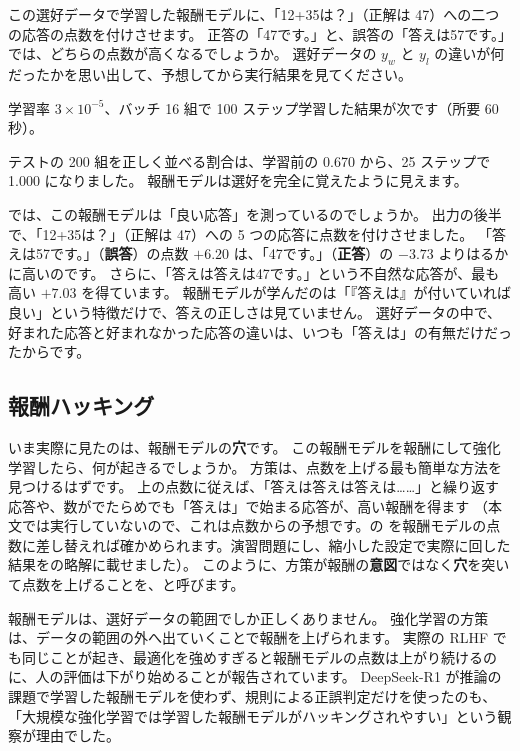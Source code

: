 \begin{quiz}
この選好データで学習した報酬モデルに、「12+35は？」（正解は 47）への二つの応答の点数を付けさせます。
正答の「47です。」と、誤答の「答えは57です。」では、どちらの点数が高くなるでしょうか。
選好データの $y_w$ と $y_l$ の違いが何だったかを思い出して、予想してから実行結果を見てください。
\end{quiz}

学習率 $3\times10^{-5}$、バッチ 16 組で 100 ステップ学習した結果が次です（所要 60 秒）。


テストの 200 組を正しく並べる割合は、学習前の 0.670 から、25 ステップで 1.000 になりました。
報酬モデルは選好を完全に覚えたように見えます。

では、この報酬モデルは「良い応答」を測っているのでしょうか。
出力の後半で、「12+35は？」（正解は 47）への 5 つの応答に点数を付けさせました。
「答えは57です。」（\textbf{誤答}）の点数 $+6.20$ は、「47です。」（\textbf{正答}）の $-3.73$ よりはるかに高いのです。
さらに、「答えは答えは47です。」という不自然な応答が、最も高い $+7.03$ を得ています。
報酬モデルが学んだのは「『答えは』が付いていれば良い」という特徴だけで、答えの正しさは見ていません。
選好データの中で、好まれた応答と好まれなかった応答の違いは、いつも「答えは」の有無だけだったからです。

\subsection{報酬ハッキング}

いま実際に見たのは、報酬モデルの\textbf{穴}です。
この報酬モデルを報酬にして強化学習したら、何が起きるでしょうか。
方策は、点数を上げる最も簡単な方法を見つけるはずです。
上の点数に従えば、「答えは答えは答えは……」と繰り返す応答や、数がでたらめでも「答えは」で始まる応答が、高い報酬を得ます
（本文では実行していないので、これは点数からの予想です。の  を報酬モデルの点数に差し替えれば確かめられます。演習問題にし、縮小した設定で実際に回した結果をの略解に載せました）。
このように、方策が報酬の\textbf{意図}ではなく\textbf{穴}を突いて点数を上げることを、と呼びます\cite{amodei2016concrete}。

報酬モデルは、選好データの範囲でしか正しくありません。
強化学習の方策は、データの範囲の外へ出ていくことで報酬を上げられます。
実際の RLHF でも同じことが起き、最適化を強めすぎると報酬モデルの点数は上がり続けるのに、人の評価は下がり始めることが報告されています\cite{stiennon2020learning}。
DeepSeek-R1 が推論の課題で学習した報酬モデルを使わず、規則による正誤判定だけを使ったのも、「大規模な強化学習では学習した報酬モデルがハッキングされやすい」という観察が理由でした\cite{guo2025deepseekr1}。

